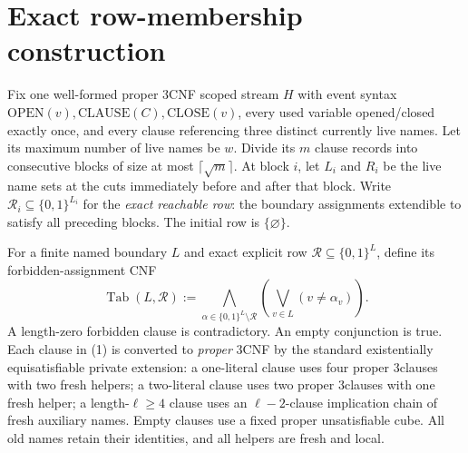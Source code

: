 \documentclass[11pt]{article}
\begin{document}
\section{Exact row-membership construction}
Fix one well-formed proper 3CNF scoped stream $H$ with event syntax
$\mathrm{OPEN}(v),\mathrm{CLAUSE}(C),\mathrm{CLOSE}(v)$, every used variable
opened/closed exactly once, and every clause referencing three distinct
currently live names.  Let its maximum number of live names be $w$.
Divide its $m$ clause records into consecutive blocks of size at most
$\lceil\sqrt m\rceil$.  At block $i$, let $L_i$ and $R_i$ be the live
name sets at the cuts immediately before and after that block.  Write
$\mathcal R_i\subseteq\{0,1\}^{L_i}$ for the \emph{exact reachable row}:
the boundary assignments extendible to satisfy all preceding blocks.
The initial row is $\{\varnothing\}$.

For a finite named boundary $L$ and exact explicit row
$\mathcal R\subseteq\{0,1\}^L$, define its forbidden-assignment CNF
\[
\operatorname{Tab}(L,\mathcal R)
:=\bigwedge_{\alpha\in\{0,1\}^{L}\setminus\mathcal R}
\left(\bigvee_{v\in L}(v\ne\alpha_v)\right).
\tag{1}
\]
A length-zero forbidden clause is contradictory.  An empty conjunction is
true. Each clause in (1) is converted to \emph{proper} 3CNF by the
standard existentially equisatisfiable private extension: a one-literal
clause uses four proper 3clauses with two fresh helpers; a two-literal
clause uses two proper 3clauses with one fresh helper; a length-$\ell\ge4$
clause uses an $\ell-2$-clause implication chain of fresh auxiliary names.
Empty clauses use a fixed proper unsatisfiable cube.
All old names retain their identities, and all helpers are fresh and local.
\end{document}
